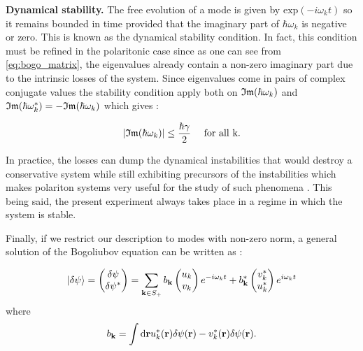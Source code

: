 \bigskip

\textbf{Dynamical stability.} The free evolution of a mode is given by $\mathrm{exp}(-i\omega_k t)$ so it remains 
bounded in time provided that the imaginary part of $\hbar\omega_k$ is negative or zero. This is known as the dynamical stability condition.
In fact, this condition must be refined in the polaritonic case since as one can see from \autoref{eq:bogo_matrix}, the eigenvalues already 
contain a non-zero imaginary part due to the intrinsic losses of the system. Since eigenvalues come in pairs of complex conjugate values the stability condition 
apply both on $\mathfrak{Im}{(\hbar\omega_k)}$ and $\mathfrak{Im}{(\hbar\omega_k^*)}=-\mathfrak{Im}{(\hbar\omega_k)}$ which gives :

\begin{equation}
    \abs{\mathfrak{Im}{(\hbar\omega_k)}} \leq \dfrac{\hbar\gamma}{2}   \ \ \ \ \mathrm{for \  all  \  k.}
\end{equation}

In practice, the losses can dump the dynamical instabilities that
would destroy a conservative system while still exhibiting precursors of the instabilities which makes polariton systems very useful for the study of such phenomena 
\cite{claude_high-resolution_2022}. This being said, the present experiment always takes place in a regime in which the system is stable. 

\bigskip

Finally, if we restrict our description to modes with non-zero norm, a general solution of the Bogoliubov equation can be written as :


\begin{equation}
    \label{eq:general_solution_for_fluctuations_classical}
    \ket{\delta \psi}=
    \begin{pmatrix}
    \delta\psi \\
    \delta\psi^*
    \end{pmatrix} = \sum_{\mathbf{k} \in S_+} b_{\mathbf{k}}
    \begin{pmatrix}
    u_k \\
    v_k
    \end{pmatrix}e^{-i\omega_kt}
    + b^*_{\mathbf{k}}   
     \begin{pmatrix}
        v^*_k \\
        u^*_k
        \end{pmatrix}e^{i\omega_kt}
\end{equation}
where 
\begin{equation}
    b_{\mathbf{k}} = \int \mathrm{d}\mathbf{r} u_k^*(\mathbf{r})\delta\psi(\mathbf{r})-v_k^*(\mathbf{r})\delta\psi(\mathbf{r}). 
\end{equation}

